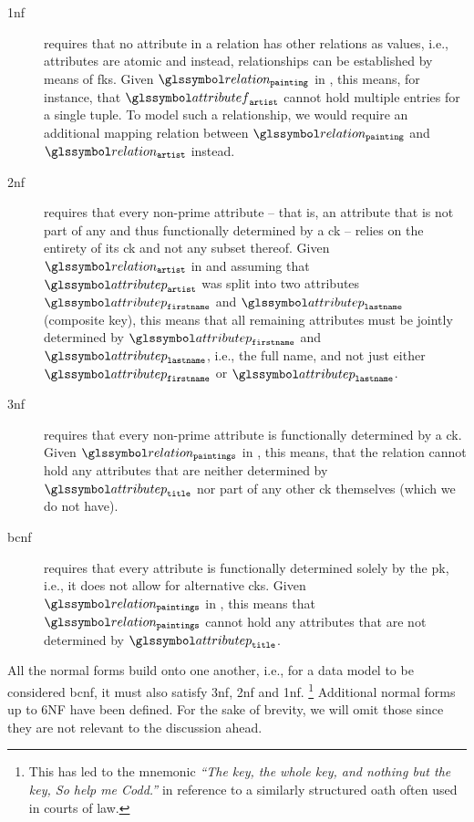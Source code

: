 \begin{description}
    \item[\acrfull{1nf}] requires that no attribute in a relation has other relations as values, i.e., attributes are atomic and instead, relationships can be established by means of \acrshort{fk}s. Given $\relation_{\mathtt{painting}}$ in , this means, for instance, that $\attributef_{\mathtt{artist}}$ cannot hold multiple entries for a single tuple. To model such a relationship, we would require an additional mapping relation between $\relation_{\mathtt{painting}}$ and $\relation_{\mathtt{artist}}$ instead.
   
    \item[\acrfull{2nf}] requires that every non-prime attribute -- that is, an attribute that is not part of any and thus functionally determined by a \acrshort{ck} -- relies on the entirety of its \acrshort{ck} and not any subset thereof. Given $\relation_{\mathtt{artist}}$ in  and assuming that  $\attributep_{\mathtt{artist}}$ was split into two attributes $\attributep_{\mathtt{firstname}}$ and $\attributep_{\mathtt{lastname}}$ (composite key), this means that all remaining attributes must be jointly determined by $\attributep_{\mathtt{firstname}}$ and $\attributep_{\mathtt{lastname}}$, i.e., the full name, and not just either $\attributep_{\mathtt{firstname}}$ or $\attributep_{\mathtt{lastname}}$.
     
    \item[\acrfull{3nf}] requires that every non-prime attribute is functionally determined by a \acrshort{ck}. Given $\relation_{\mathtt{paintings}}$ in , this means, that the relation cannot hold any attributes that are neither determined by $\attributep_{\mathtt{title}}$ nor part of any other \acrshort{ck} themselves (which we do not have).
    
    \item[\acrfull{bcnf}] requires that every attribute is functionally determined solely by the \acrshort{pk}, i.e., it does not allow for alternative \acrshort{ck}s. Given $\relation_{\mathtt{paintings}}$ in , this means that $\relation_{\mathtt{paintings}}$  cannot hold any attributes that are not determined by $\attributep_{\mathtt{title}}$.

\end{description}

All the normal forms build onto one another, i.e., for a data model to be considered \acrshort{bcnf}, it must also satisfy \acrshort{3nf}, \acrshort{2nf} and \acrshort{1nf}. \footnote{This has led to the mnemonic \emph{``The key, the whole key, and nothing but the key, So help me Codd.''} in reference to a similarly structured oath often used in courts of law.} Additional normal forms up to 6NF have been defined. For the sake of brevity, we will omit those since they are not relevant to the discussion ahead.

